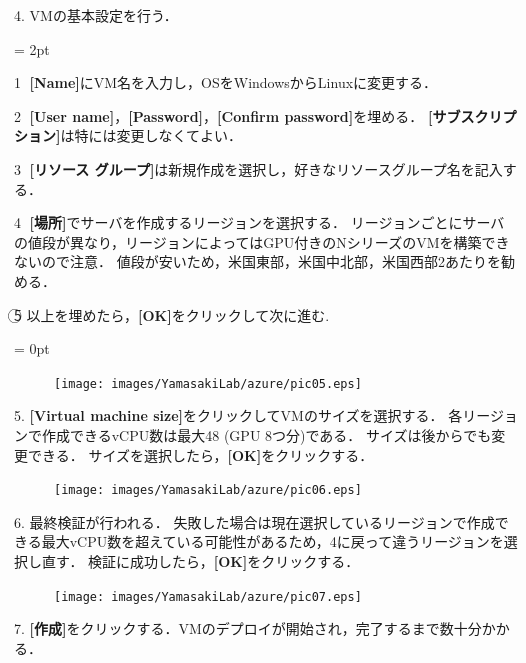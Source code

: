 4. VMの基本設定を行う．

\parindent = 2pt

\textcircled{\scriptsize 1} {\bf[Name]}にVM名を入力し，OSをWindowsからLinuxに変更する．

\textcircled{\scriptsize 2} {\bf[User name]}，{\bf[Password]}，{\bf[Confirm password]}を埋める．
{\bf[サブスクリプション]}は特には変更しなくてよい．

\textcircled{\scriptsize 3} {\bf[リソース グループ]}は新規作成を選択し，好きなリソースグループ名を記入する．

\textcircled{\scriptsize 4} {\bf[場所]}でサーバを作成するリージョンを選択する．
リージョンごとにサーバの値段が異なり，リージョンによってはGPU付きのNシリーズのVMを構築できないので注意．
値段が安いため，米国東部，米国中北部，米国西部2あたりを勧める．

\textcircled{\scriptsize 5} 以上を埋めたら，{\bf[OK]}をクリックして次に進む.

\parindent = 0pt

\begin{figure}[ht]
	\begin{center}
		\texttt{[image: images/YamasakiLab/azure/pic05.eps]}
	\end{center}
\end{figure}

\newpage

5. {\bf[Virtual machine size]}をクリックしてVMのサイズを選択する．
各リージョンで作成できるvCPU数は最大48 (GPU 8つ分)である．
サイズは後からでも変更できる．
サイズを選択したら，{\bf[OK]}をクリックする．

\begin{figure}[ht]
	\begin{center}
		\texttt{[image: images/YamasakiLab/azure/pic06.eps]}
	\end{center}
\end{figure}

6. 最終検証が行われる．
失敗した場合は現在選択しているリージョンで作成できる最大vCPU数を超えている可能性があるため，4に戻って違うリージョンを選択し直す．
検証に成功したら，{\bf[OK]}をクリックする．

\begin{figure}[ht]
	\begin{center}
		\texttt{[image: images/YamasakiLab/azure/pic07.eps]}
	\end{center}
\end{figure}

7. {\bf[作成]}をクリックする．VMのデプロイが開始され，完了するまで数十分かかる．

